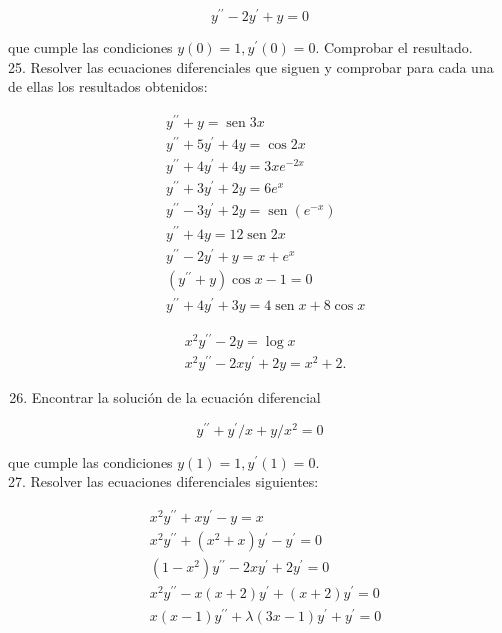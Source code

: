 \documentclass[10pt]{article}
\theoremstyle{plain}
\theoremstyle{definition}
\theoremstyle{remark}
\begin{document}
$$
y^{\prime \prime}-2 y^{\prime}+y=0
$$

que cumple las condiciones $y(0)=1, y^{\prime}(0)=0$. Comprobar el resultado.\\
25. Resolver las ecuaciones diferenciales que siguen y comprobar para cada una de ellas los resultados obtenidos:

$$
\begin{aligned}
& y^{\prime \prime}+y=\operatorname{sen} 3 x \\
& y^{\prime \prime}+5 y^{\prime}+4 y=\cos 2 x \\
& y^{\prime \prime}+4 y^{\prime}+4 y=3 x e^{-2 x} \\
& y^{\prime \prime}+3 y^{\prime}+2 y=6 e^{x} \\
& y^{\prime \prime}-3 y^{\prime}+2 y=\operatorname{sen}\left(e^{-x}\right) \\
& y^{\prime \prime}+4 y=12 \operatorname{sen} 2 x \\
& y^{\prime \prime}-2 y^{\prime}+y=x+e^{x} \\
& \left(y^{\prime \prime}+y\right) \cos x-1=0 \\
& y^{\prime \prime}+4 y^{\prime}+3 y=4 \operatorname{sen} x+8 \cos x
\end{aligned}
$$


$$
\begin{aligned}
& x^{2} y^{\prime \prime}-2 y=\log x \\
& x^{2} y^{\prime \prime}-2 x y^{\prime}+2 y=x^{2}+2 .
\end{aligned}
$$

\begin{enumerate}
  \setcounter{enumi}{25}
  \item Encontrar la solución de la ecuación diferencial
\end{enumerate}

$$
y^{\prime \prime}+y^{\prime} / x+y / x^{2}=0
$$

que cumple las condiciones $y(1)=1, y^{\prime}(1)=0$.\\
27. Resolver las ecuaciones diferenciales siguientes:

$$
\begin{aligned}
& x^{2} y^{\prime \prime}+x y^{\prime}-y=x \\
& x^{2} y^{\prime \prime}+\left(x^{2}+x\right) y^{\prime}-y^{\prime}=0 \\
& \left(1-x^{2}\right) y^{\prime \prime}-2 x y^{\prime}+2 y^{\prime}=0 \\
& x^{2} y^{\prime \prime}-x(x+2) y^{\prime}+(x+2) y^{\prime}=0 \\
& x(x-1) y^{\prime \prime}+\lambda(3 x-1) y^{\prime}+y^{\prime}=0
\end{aligned}
$$
\end{document}
